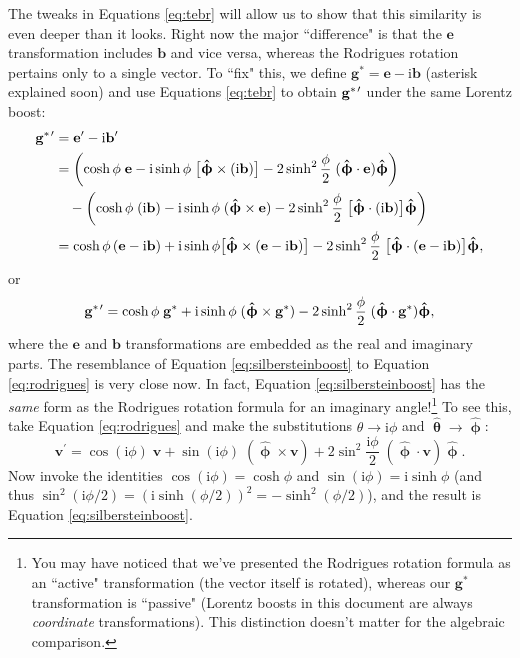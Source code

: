 \documentclass[12pt]{article}
\renewcommand{\vv}[1]{\mathbf{#1}}
\newcommand{\hatphi}{\bm{\hat{\upphi}}}
\begin{document}
The tweaks in Equations \ref{eq:tebr} will allow us to show that this similarity is even deeper than it looks. Right now the major ``difference" is that the $\vv e$ transformation includes $\vv b$ and vice versa, whereas the Rodrigues rotation pertains only to a single vector. To ``fix" this, we define $\vv g^{*} = \vv e - \textrm{i} \vv b$ (asterisk explained soon) and use Equations \ref{eq:tebr} to obtain $\vv g ^{* \mkern2mu \prime}$ under the same Lorentz boost:
\begin{equation*}
\begin{split}
\vv g^{* \mkern2mu \prime} &= \vv e ^\prime - \textrm{i} \vv b ^\prime \\
&= \left( \cosh{\phi} \; \vv e - \textrm{i} \sinh{\phi} \; \big[ \hatphi \times (\textrm i \vv b) \big] - 2 \sinh^2 \frac{\phi}{2} \; (\hatphi \cdot \vv e) \hatphi \right) \\
& \quad - \left( \cosh{\phi} \; (\textrm{i} \vv b) - \textrm{i} \sinh{\phi} \; (\hatphi \times \vv e) - 2 \sinh^2 \frac{\phi}{2} \; \big[ \hatphi \cdot (\textrm{i} \vv b) \big] \hatphi \right) \\
&= \cosh{\phi} \left( \vv e - \textrm{i} \vv b \right) + \textrm{i} \sinh{\phi} \big[ \hatphi \times (\vv e - \textrm i \vv b)  \big] - 2 \sinh^2 \frac{\phi}{2} \; \big[ \hatphi \cdot (\vv e - \textrm{i} \vv b) \big] \hatphi ,
\end{split}
\end{equation*}
or
\begin{equation}\label{eq:silbersteinboost}
\vv g^{* \mkern2mu \prime} = \cosh{\phi} \; \vv g^{*} + \textrm{i} \sinh{\phi} \; ( \hatphi \times \vv g^{*} ) - 2 \sinh^2 \frac{\phi}{2} \; ( \hatphi \cdot \vv g^{*} ) \hatphi ,
\end{equation}
where the $\vv e$ and $\vv b$ transformations are embedded as the real and imaginary parts. The resemblance of Equation \ref{eq:silbersteinboost} to Equation \ref{eq:rodrigues} is very close now. In fact, Equation \ref{eq:silbersteinboost} has the \emph{same} form as the Rodrigues rotation formula for an imaginary angle!\footnote{\label{fn:activepassive}You may have noticed that we've presented the Rodrigues rotation formula as an ``active" transformation (the vector itself is rotated), whereas our $\vv g^*$ transformation is ``passive" (Lorentz boosts in this document are always \emph{coordinate} transformations). This distinction doesn't matter for the algebraic comparison.} To see this, take Equation \ref{eq:rodrigues} and make the substitutions $\theta \rightarrow \textrm{i} \phi$ and $\vv{\hat{\uptheta}} \rightarrow \hatphi$:
\begin{equation*}
\vv v^\prime = \cos{(\textrm{i} \phi)} \; \vv v + \sin{(\textrm{i} \phi)} \; ( \hatphi \times \vv v ) + 2 \sin^2 \frac{\textrm{i} \phi}{2} \; (\hatphi \cdot \vv v) \hatphi .
\end{equation*}
Now invoke the identities $\cos{(\textrm{i} \phi)} = \cosh \phi$ and $\sin{(\textrm{i} \phi)} = \textrm{i} \sinh{\phi}$ (and thus $\sin^2 (\textrm{i} \phi / 2) = (\textrm{i} \sinh (\phi / 2))^2 = - \sinh^2 (\phi / 2)$), and the result is Equation \ref{eq:silbersteinboost}.
\end{document}
